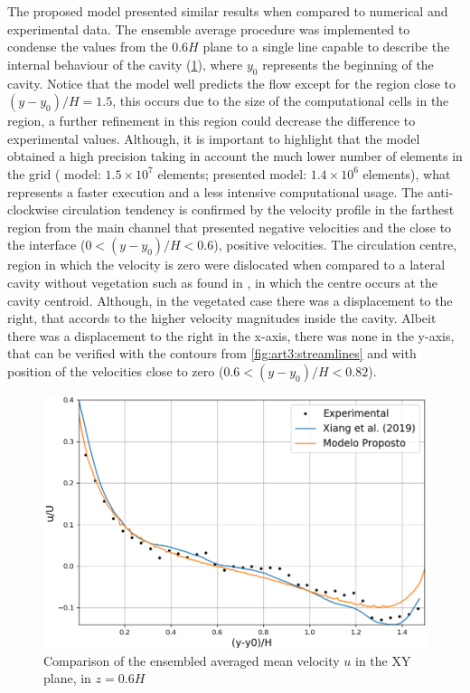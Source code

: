 The proposed model presented similar results when compared to numerical and experimental data. The ensemble average procedure was implemented to condense the values from the $0.6H$ plane to a single line capable to describe the internal behaviour of the cavity (\ref{fig:art3:graph}), where $y_0$ represents the beginning of the cavity. Notice that the model well predicts the flow except for the region close to $(y-y_0)/H=1.5$, this occurs due to the size of the computational cells in the region, a further refinement in this region could decrease the difference to experimental values. Although, it is important to highlight that the model obtained a high precision taking in account the much lower number of elements in the grid (\cite{xiang2019} model: $1.5\times 10^7$ elements; presented model: $1.4 \times 10^6$ elements), what represents a faster execution and a less intensive computational usage. The anti-clockwise circulation tendency is confirmed by the velocity profile in the farthest region from the main channel that presented negative velocities and the close to the interface ($0<(y-y_0)/H<0.6$), positive velocities. The circulation centre, region in which the velocity is zero were dislocated when compared to a lateral cavity without vegetation such as found in \textcite{gualtieri2010}, in which the centre occurs at the cavity centroid. Although,  in the vegetated case there was a displacement to the right, that accords to the higher velocity magnitudes inside the cavity. Albeit there was a displacement to the right in the x-axis, there was none in the y-axis, that can be verified with the contours from \ref{fig:art3:streamlines} and with position of the velocities close to zero ($0.6<(y-y_0)/H<0.82$).
\begin{figure}[!ht]
\centering
\includegraphics[width=\linewidth]{../images/art3/imgEst5.png}
\caption{Comparison of the ensembled averaged mean velocity $u$ in the XY plane, in $z=0.6H$}
\label{fig:art3:graph}
\end{figure}
